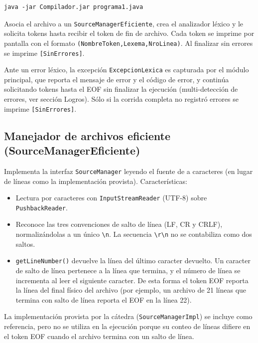 \documentclass[11pt,a4paper]{article}
\begin{document}
\begin{verbatim}
java -jar Compilador.jar programa1.java
\end{verbatim}

Asocia el archivo a un \texttt{SourceManagerEficiente}, crea el analizador léxico y le solicita
tokens hasta recibir el token de fin de archivo. Cada token se imprime por pantalla con el
formato \texttt{(NombreToken,Lexema,NroLinea)}. Al finalizar sin errores se imprime
\texttt{[SinErrores]}.

Ante un error léxico, la excepción \texttt{ExcepcionLexica} es capturada por el módulo principal,
que reporta el mensaje de error y el código de error, y continúa solicitando tokens hasta el
EOF sin finalizar la ejecución (multi-detección de errores, ver sección Logros). Sólo si la
corrida completa no registró errores se imprime \texttt{[SinErrores]}.

\subsection{Manejador de archivos eficiente (SourceManagerEficiente)}

Implementa la interfaz \texttt{SourceManager} leyendo el fuente de a caracteres (en lugar de
líneas como la implementación provista). Características:

\begin{itemize}
  \item Lectura por caracteres con \texttt{InputStreamReader} (UTF-8) sobre \texttt{PushbackReader}.
  \item Reconoce las tres convenciones de salto de línea (LF, CR y CRLF), normalizándolas a un
        único \verb!\n!. La secuencia \verb!\r\n! no se
        contabiliza como dos saltos.
  \item \texttt{getLineNumber()} devuelve la línea del último caracter devuelto. Un caracter de salto
        de línea pertenece a la línea que termina, y el número de línea se incrementa al leer
        el siguiente caracter. De esta forma el token EOF reporta la línea del final físico
        del archivo (por ejemplo, un archivo de 21 líneas que termina con salto de línea
        reporta el EOF en la línea 22).
\end{itemize}

La implementación provista por la cátedra (\texttt{SourceManagerImpl}) se incluye como
referencia, pero no se utiliza en la ejecución porque su conteo de líneas difiere en el
token EOF cuando el archivo termina con un salto de línea.
\end{document}
